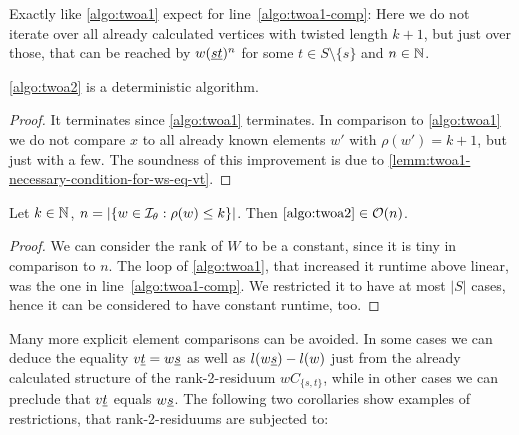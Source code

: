 \begin{algo}[TWOA2]
	Exactly like \ref{algo:twoa1} expect for line~\ref{algo:twoa1-comp}: Here we do not iterate over all already calculated vertices with twisted length $k+1$, but just over those, that can be reached by $w(\underline{s} \underline{t})^n$ for some $t \in S \setminus \{s\}$ and $n \in \mathbb{N}$.
\end{algo}

\begin{lemm}
	\ref{algo:twoa2} is a deterministic algorithm.

	\begin{proof}
		It terminates since \ref{algo:twoa1} terminates. In comparison to \ref{algo:twoa1} we do not compare $x$ to all already known elements $w'$ with $\rho(w') = k+1$, but just with a few. The soundness of this improvement is due to \ref{lemm:twoa1-necessary-condition-for-ws-eq-vt}.
	\end{proof}
\end{lemm}

\begin{lemm}
	Let $k \in \mathbb{N}$, $n = |\{ w \in \mathcal{I}_{\theta} : \rho(w) \leq k \}|$. Then $\ref{algo:twoa2} \in \mathcal{O}(n)$.

	\begin{proof}
		We can consider the rank of $W$ to be a constant, since it is tiny in comparison to $n$. The loop of \ref{algo:twoa1}, that increased it runtime above linear, was the one in line~\ref{algo:twoa1-comp}. We restricted it to have at most $|S|$ cases, hence it can be considered to have constant runtime, too.
	\end{proof}
\end{lemm}

Many more explicit element comparisons can be avoided. In some cases we can deduce the equality $v \underline{t} = w \underline{s}$ as well as $l(w \underline{s}) - l(w)$ just from the already calculated structure of the rank-2-residuum $wC_{\{s,t\}}$, while in other cases we can preclude that $v \underline{t}$ equals $w \underline{s}$. The following two corollaries show examples of restrictions, that rank-2-residuums are subjected to:

